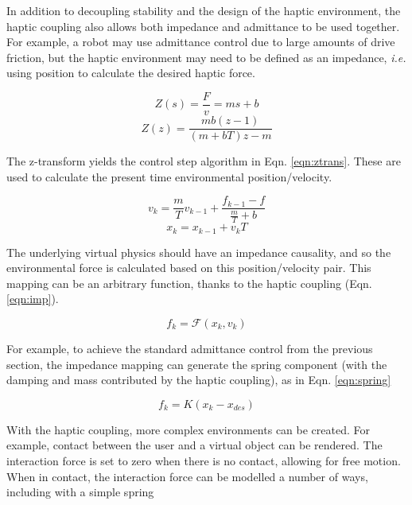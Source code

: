 \documentclass[12pt]{report}
\begin{document}
	In addition to decoupling stability and the design of the haptic environment, the haptic coupling also allows both impedance and admittance to be used together. For example, a robot may use admittance control due to large amounts of drive friction, but the haptic environment may need to be defined as an impedance, \textit{i.e.} using position to calculate the desired haptic force. 
	
	\begin{equation}
		Z(s) = \frac{F}{v} = ms + b  
	\end{equation}
	\begin{equation}
		Z(z) = \frac{mb(z-1)}{(m+bT)z - m}
	\end{equation}
	
	The z-transform yields the control step algorithm in Eqn. \ref{eqn:ztrans}. These are used to calculate the present time environmental position/velocity. 

\begin{equation} \label{eqn:ztrans}
	v_k = \frac{m}{T}v_{k-1} + \frac{f_{k-1} - f}{\frac{m}{T} + b}
\end{equation}
\begin{equation}
	x_k = x_{k-1} + v_{k}T
\end{equation}

	
The underlying virtual physics should have an impedance causality, and so the environmental force is calculated based on this position/velocity pair. This mapping can be an arbitrary function, thanks to the haptic coupling (Eqn. \ref{eqn:imp}). 
 
\begin{equation} \label{eqn:imp}
	f_k = \mathcal{F}(x_k, v_k)
\end{equation}

For example, to achieve the standard admittance control from the previous section, the impedance mapping can generate the spring component (with the damping and mass contributed by the haptic coupling), as in Eqn. \ref{eqn:spring}

\begin{equation} \label{eqn:spring} 
	f_k = K(x_k - x_{des})
\end{equation}

With the haptic coupling, more complex environments can be created. For example, contact between the user and a virtual object can be rendered. The interaction force is set to zero when there is no contact, allowing for free motion. When in contact, the interaction force can be modelled a number of ways, including with a simple spring
\end{document}
